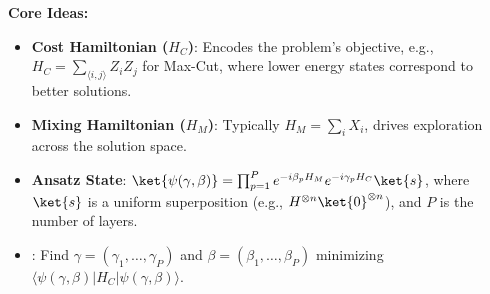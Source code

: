 \noindent
\textbf{Core Ideas:}
\begin{itemize}
  \item \textbf{Cost Hamiltonian ($H_C$)}: Encodes the problem's objective,
    e.g., $H_C = \sum_{\langle i,j \rangle} Z_i Z_j$ for Max-Cut, where lower
    energy states correspond to better solutions.

    \vspace{0.3cm}

  \item \textbf{Mixing Hamiltonian ($H_M$)}: Typically $H_M = \sum_i X_i$,
    drives exploration across the solution space.

    \vspace{0.3cm}

  \item \textbf{Ansatz State}: $\ket{\psi(\gamma, \beta)} = \prod_{p=1}^P
    e^{-i\beta_p H_M} e^{-i\gamma_p H_C} \ket{s}$, where $\ket{s}$ is a
    uniform superposition (e.g., $H^{\otimes n} \ket{0}^{\otimes n}$), and
    $P$ is the number of layers.

    \vspace{0.3cm}

  \item {}: Find $\gamma = (\gamma_1, \ldots, \gamma_P)$ and
    $\beta = (\beta_1, \ldots, \beta_P)$ minimizing $\langle \psi(\gamma,
    \beta) | H_C | \psi(\gamma, \beta) \rangle$.

\end{itemize}

\vspace{0.3cm}


\vspace{0.3cm}

